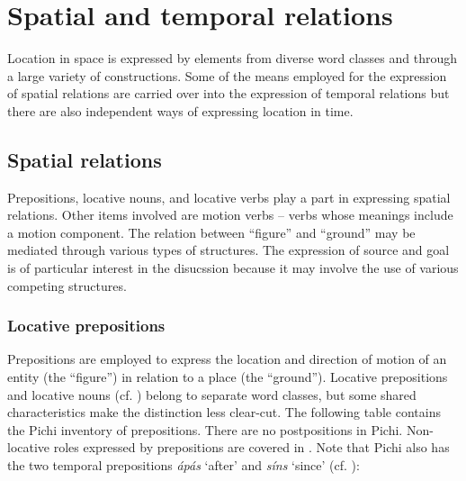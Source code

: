 \chapter{Spatial and temporal relations}

Location in space is expressed by elements from diverse word classes and through a large variety of constructions. Some of the means employed for the expression of spatial relations are carried over into the expression of temporal relations but there are also independent ways of expressing location in time. 

\section{Spatial relations}\label{sec:8.1}

Prepositions, locative nouns, and locative verbs play a part in expressing spatial relations. Other items involved are motion verbs – verbs whose meanings include a motion component. The relation between “figure” and “ground” may be mediated through various types of structures. The expression of source and goal is of particular interest in the disucssion because it may involve the use of various competing structures.

\subsection{Locative prepositions}\label{sec:8.1.1}

Prepositions are employed to express the location and direction of motion of an entity (the “figure”) in relation to a place (the “ground”). Locative prepositions and locative nouns (cf. ) belong to separate word classes, but some shared characteristics make the distinction less clear-cut. The following table contains the Pichi inventory of prepositions. There are no postpositions in Pichi. Non-locative roles expressed by prepositions are covered in . Note that Pichi also has the two temporal prepositions \textit{ápás} ‘after’ and \textit{síns} ‘since’ (cf. ): 

